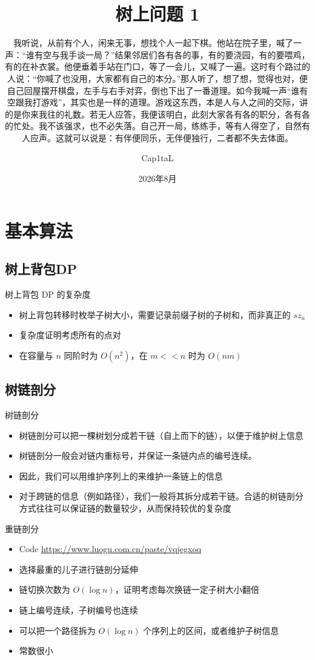 ﻿\documentclass[aspectratio=169]{ctexbeamer}
\author{Cap1taL}
\title{树上问题 1}
\subtitle{我听说，从前有个人，闲来无事，想找个人一起下棋。他站在院子里，喊了一声：“谁有空与我手谈一局？”结果邻居们各有各的事，有的要浇园，有的要喂鸡，有的在补衣裳。他便垂着手站在门口，等了一会儿，又喊了一遍。这时有个路过的人说：“你喊了也没用，大家都有自己的本分。”那人听了，想了想，觉得也对，便自己回屋摆开棋盘，左手与右手对弈，倒也下出了一番道理。如今我喊一声“谁有空跟我打游戏”，其实也是一样的道理。游戏这东西，本是人与人之间的交际，讲的是你来我往的礼数。若无人应答，我便该明白，此刻大家各有各的职分，各有各的忙处。我不该强求，也不必失落。自己开一局，练练手，等有人得空了，自然有人应声。这就可以说是：有伴便同乐，无伴便独行，二者都不失去体面。}
\date{2026年8月}
\begin{document}
\kaishu

\begin{frame}
    \titlepage
\end{frame}



\section{基本算法}

\subsection{树上背包DP}
\begin{frame}{树上背包 DP 的复杂度}
    \begin{itemize}
        \item 树上背包转移时枚举子树大小，需要记录前缀子树的子树和，而非真正的 $sz_u$
        \item 复杂度证明考虑所有的点对
        \item 在容量与 $n$ 同阶时为 $O(n^2)$，在 $m<<n$ 时为 $O(nm)$
    \end{itemize}
\end{frame}

\subsection{树链剖分}
\begin{frame}{树链剖分}
    \begin{itemize}
        \item 树链剖分可以把一棵树划分成若干链（自上而下的链），以便于维护树上信息
        \item 树链剖分一般会对链内重标号，并保证一条链内点的编号连续。
        \item 因此，我们可以用维护序列上的来维护一条链上的信息
        \item 对于跨链的信息（例如路径），我们一般将其拆分成若干链。合适的树链剖分方式往往可以保证链的数量较少，从而保持较优的复杂度
    \end{itemize}
\end{frame}

\begin{frame}{重链剖分}
    \begin{itemize}
        \item Code \url{https://www.luogu.com.cn/paste/vqjegxoq}
        \item 选择最重的儿子进行链剖分延伸
        \item 链切换次数为 $O(\log n)$，证明考虑每次换链一定子树大小翻倍
        \item 链上编号连续，子树编号也连续
        \item 可以把一个路径拆为 $O(\log n)$ 个序列上的区间，或者维护子树信息
        \item 常数很小
    \end{itemize}
\end{frame}
\end{document}
